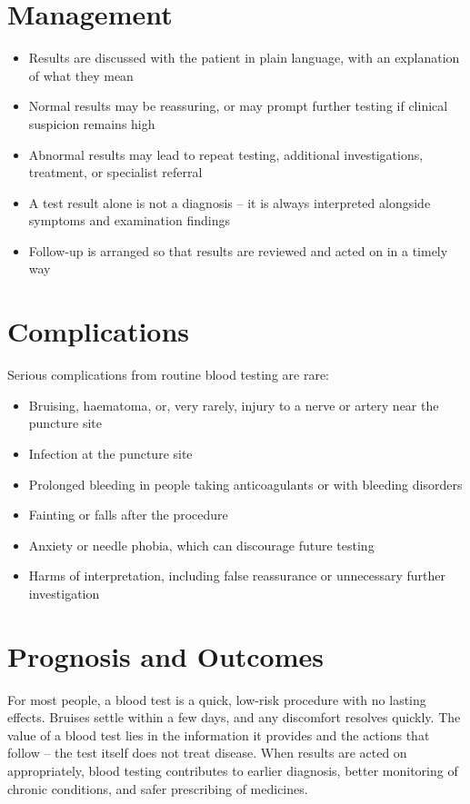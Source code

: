 \section*{Management}
\begin{itemize}
    \item Results are discussed with the patient in plain language, with an explanation of what they mean
    \item Normal results may be reassuring, or may prompt further testing if clinical suspicion remains high
    \item Abnormal results may lead to repeat testing, additional investigations, treatment, or specialist referral
    \item A test result alone is not a diagnosis -- it is always interpreted alongside symptoms and examination findings
    \item Follow-up is arranged so that results are reviewed and acted on in a timely way
\end{itemize}

\section*{Complications}
Serious complications from routine blood testing are rare:

\begin{itemize}
    \item Bruising, haematoma, or, very rarely, injury to a nerve or artery near the puncture site
    \item Infection at the puncture site
    \item Prolonged bleeding in people taking anticoagulants or with bleeding disorders
    \item Fainting or falls after the procedure
    \item Anxiety or needle phobia, which can discourage future testing
    \item Harms of interpretation, including false reassurance or unnecessary further investigation
\end{itemize}

\section*{Prognosis and Outcomes}
For most people, a blood test is a quick, low-risk procedure with no lasting effects. Bruises settle within a few days, and any discomfort resolves quickly. The value of a blood test lies in the information it provides and the actions that follow -- the test itself does not treat disease. When results are acted on appropriately, blood testing contributes to earlier diagnosis, better monitoring of chronic conditions, and safer prescribing of medicines.

